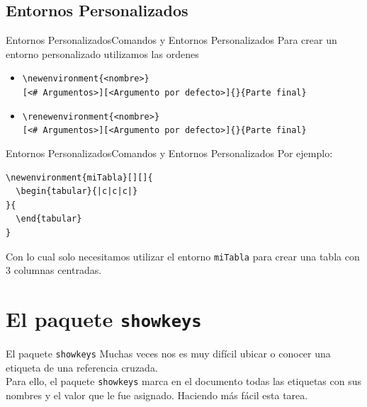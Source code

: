 \documentclass[12pt,aspectratio=43]{beamer}
\begin{document}
\subsection{Entornos Personalizados}
\begin{frame}[fragile]{Entornos Personalizados}{Comandos y Entornos Personalizados}
Para crear un entorno personalizado utilizamos las ordenes

\begin{itemize}[<+->]
	\item \lstinline|\newenvironment{<nombre>}|\\
	\texttt{[<\# Argumentos>][<Argumento por defecto>]\{<Parte inicial>\}\{Parte final\}}
	\item \lstinline|\renewenvironment{<nombre>}|\\
	\texttt{[<\# Argumentos>][<Argumento por defecto>]\{<Parte inicial>\}\{Parte final\}}
\end{itemize}
\end{frame}

\begin{frame}[fragile]{Entornos Personalizados}{Comandos y Entornos Personalizados}
Por ejemplo:\\[1em]

\begin{lstlisting}
\newenvironment{miTabla}[][]{
  \begin{tabular}{|c|c|c|}
}{
  \end{tabular}
}
\end{lstlisting}\vspace{1em}

Con lo cual solo necesitamos utilizar el entorno \texttt{miTabla} para crear una tabla con 3 columnas centradas.
\end{frame}

\section{El paquete \texttt{showkeys}}
\begin{frame}{El paquete \texttt{showkeys}}{}
Muchas veces nos es muy difícil ubicar o conocer una etiqueta de una referencia cruzada.\pause\\[1em]

Para ello, el paquete \texttt{showkeys} marca en el documento todas las etiquetas con sus nombres y el valor que le fue asignado. Haciendo más fácil esta tarea.
\end{frame}
\end{document}
